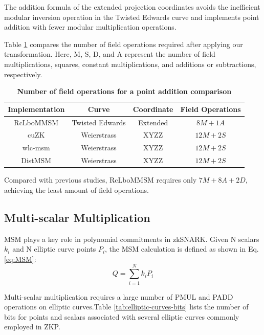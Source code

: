 \documentclass[conference]{IEEEtran}
\begin{document}
The addition formula of the extended projection coordinates avoids the inefficient modular inversion operation in the Twisted Edwards curve and implements point addition with fewer modular multiplication operations.

Table \ref{tab:field-operations} compares the number of field operations required after applying our transformation. Here, M, S, D, and A represent the number of field multiplications, squares, constant multiplications, and additions or subtractions, respectively.

\begin{table}[htbp]
    \caption{\textbf{Number of field operations for a point addition comparison}}
    \begin{center}
    \begin{tabular}{|c|c|c|c|}
    \hline
    \textbf{Implementation} & \textbf{Curve} & \textbf{Coordinate} & \textbf{Field Operations} \\
    \hline
    RcLboMMSM & Twisted Edwards & Extended & $8M + 1A$ \\
    \hline
    cuZK & Weierstrass & XYZZ & $12M + 2S$ \\
    \hline
    wlc-msm & Weierstrass & XYZZ & $12M + 2S$ \\
    \hline
    DistMSM & Weierstrass & XYZZ & $12M + 2S$ \\
    \hline
    \end{tabular}
    \label{tab:field-operations}
    \end{center}
\end{table}

Compared with previous studies, RcLboMMSM requires only $7M + 8A + 2D$, achieving the least amount of field operations.

\subsection{Multi-scalar Multiplication}

MSM plays a key role in polynomial commitments in zkSNARK. Given N scalars $k_i$ and N elliptic curve points $P_i$, the MSM calculation is defined as shown in Eq. \eqref{eq:MSM}:
\begin{equation}
    \label{eq:MSM}
    Q=\sum_{i=1}^Nk_iP_i
\end{equation}

Multi-scalar multiplication requires a large number of PMUL and PADD operations on elliptic curves.Table \ref{tab:elliptic-curves-bits} lists the number of bits for points and scalars associated with several elliptic curves commonly employed in ZKP.
\end{document}
